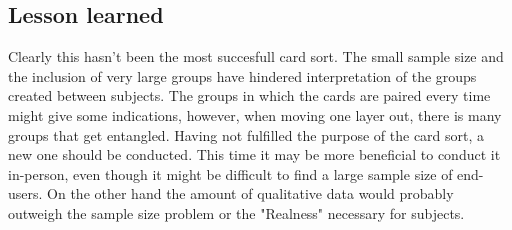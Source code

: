 \subsection{Lesson learned}
\label{LessonLearned}
Clearly this hasn't been the most succesfull card sort. The small sample size and the inclusion of very large groups have hindered interpretation of the groups created between subjects. The groups in which the cards are paired every time might give some indications, however, when moving one layer out, there is many groups that get entangled. Having not fulfilled the purpose of the card sort, a new one should be conducted. This time it may be more beneficial to conduct it in-person, even though it might be difficult to find a large sample size of end-users. On the other hand the amount of qualitative data would probably outweigh the sample size problem or the "Realness" necessary for subjects. 







